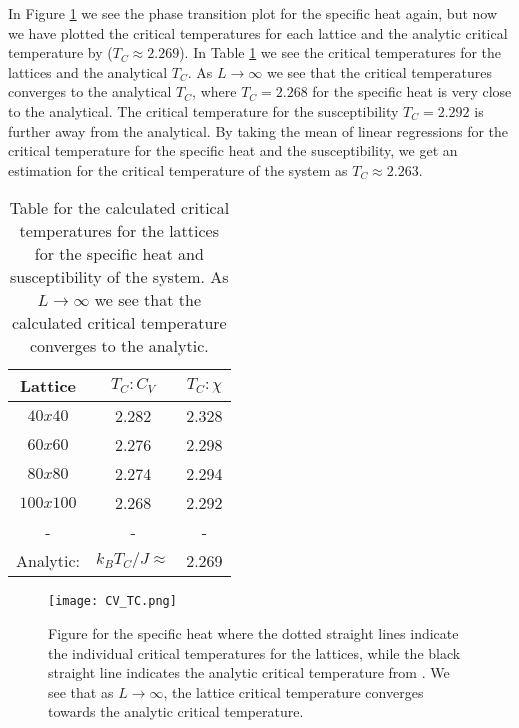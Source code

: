 \documentclass[12pt,a4paper,english]{article}
\begin{document}
In Figure \ref{fig:TC} we see the phase transition plot for the specific heat again, but now we have plotted the critical temperatures for each lattice and the analytic critical temperature by \citet{PhysRev.65.117} ($T_C\approx2.269$). In Table \ref{tab:TC} we see the critical temperatures for the lattices and the analytical $T_C$. As $L\rightarrow\infty$ we see that the critical temperatures converges to the analytical $T_C$, where $T_C=2.268$ for the specific heat is very close to the analytical. The critical temperature for the susceptibility $T_C=2.292$ is further away from the analytical. By taking the mean of linear regressions for the critical temperature for the specific heat and the susceptibility, we get an estimation for the critical temperature of the system as $T_C\approx2.263$.

\begin{table}[htbp]
	\centering
	\begin{tabular}{ |c|c|c| }
		\hline \rule{0pt}{13pt}
		Lattice & $T_C: C_V$ & $T_C: \chi$ \\
		\hline \rule{0pt}{13pt}
		$40x40$ & 2.282 & 2.328\\
		\hline \rule{0pt}{13pt}
		$60x60$ & 2.276 & 2.298\\
		\hline \rule{0pt}{13pt}
		$80x80$ & 2.274 & 2.294\\
		\hline \rule{0pt}{13pt}
		$100x100$ & 2.268 & 2.292\\
		\hline \rule{0pt}{13pt}
		- & - & - \\
		\hline \rule{0pt}{13pt}
		Analytic: & $k_BT_C/J\approx$ & 2.269 \\
		\hline 
	\end{tabular}	
	\caption{Table for the calculated critical temperatures for the lattices for the specific heat and susceptibility of the system. As $L\rightarrow\infty$ we see that the calculated critical temperature converges to the analytic.}
	\label{tab:TC}
\end{table}

\begin{figure}[htbp]
	\centering\texttt{[image: CV\_TC.png]}
	\caption{Figure for the specific heat where the dotted straight lines indicate the individual critical temperatures for the lattices, while the black straight line indicates the analytic critical temperature from \citet{PhysRev.65.117}. We see that as $L\rightarrow\infty$, the lattice critical temperature converges towards the analytic critical temperature. \label{fig:TC}}
\end{figure}
\end{document}
